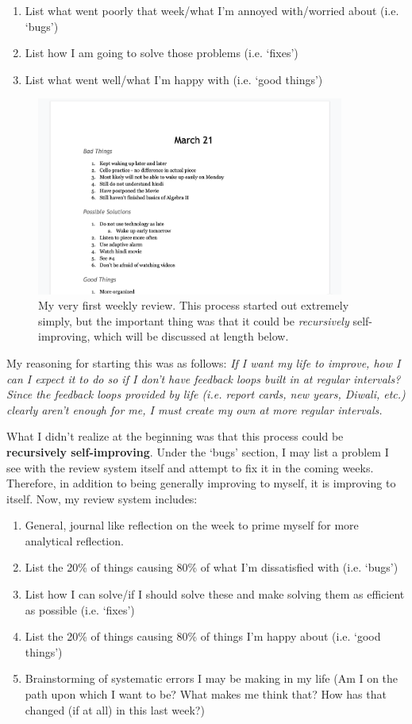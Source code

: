 \documentclass[a4paper,12pt]{article}
\begin{document}
\begin{enumerate}
	\item List what went poorly that week/what I’m annoyed with/worried about (i.e. ‘bugs’)
	\item List how I am going to solve those problems (i.e. ‘fixes’)
	\item List what went well/what I’m happy with (i.e. ‘good things’)
\end{enumerate}

\begin{figure}[H]
\centering
\includegraphics[width=0.9\textwidth]{img/image021.png}
\caption{My very first weekly review. This process started out extremely simply, but the important thing was that it could be \textit{recursively} self-improving, which will be discussed at length below.}
\label{}
\end{figure}

My reasoning for starting this was as follows: \textit{If I want my life to improve, how I can I expect it to do so if I don’t have feedback loops built in at regular intervals? Since the feedback loops provided by life (i.e. report cards, new years, Diwali, etc.) clearly aren’t enough for me, I must create my own at more regular intervals.}

What I didn’t realize at the beginning was that this process could be \textbf{recursively self-improving}. Under the ‘bugs’ section, I may list a problem I see with the review system itself and attempt to fix it in the coming weeks. Therefore, in addition to being generally improving to myself, it is improving to itself. Now, my review system includes:

\begin{enumerate}
	\item General, journal like reflection on the week to prime myself for more analytical reflection.
	\item List the 20\% of things causing 80\% of what I’m dissatisfied with (i.e. ‘bugs’)
	\item List how I can solve/if I should solve these and make solving them as efficient as possible (i.e. ‘fixes’)
	\item List the 20\% of things causing 80\% of things I’m happy about (i.e. ‘good things’)
	\item Brainstorming of systematic errors I may be making in my life (Am I on the path upon which I want to be? What makes me think that? How has that changed (if at all) in this last week?)
\end{enumerate}
\end{document}
